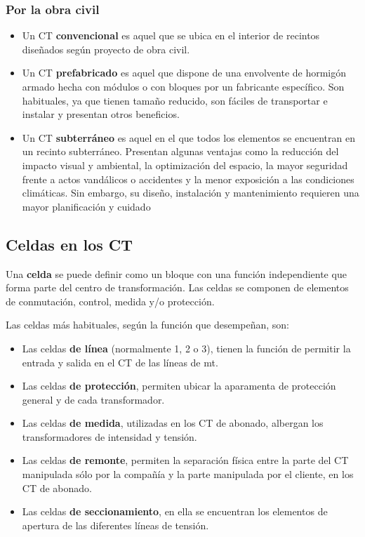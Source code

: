 \subsubsection{Por la obra civil}

\begin{itemize}
	\item Un CT \textbf{convencional} es aquel que se ubica en el interior de recintos diseñados según proyecto de obra civil.
	\item Un CT \textbf{prefabricado} es aquel que dispone de una envolvente de hormigón armado hecha con módulos o con bloques por un fabricante específico. Son habituales, ya que tienen tamaño reducido, son fáciles de transportar e instalar y presentan otros beneficios.
	\item Un CT \textbf{subterráneo} es aquel en el que todos los elementos se encuentran en un recinto subterráneo. Presentan algunas ventajas como la reducción del impacto visual y ambiental, la optimización del espacio, la mayor seguridad frente a actos vandálicos o accidentes y la menor exposición a las condiciones climáticas. Sin embargo, su diseño, instalación y mantenimiento requieren una mayor planificación y cuidado
\end{itemize}

\subsection{Celdas en los CT}

Una \textbf{celda} se puede definir como un bloque con una función independiente que forma parte del centro de transformación. Las celdas se componen de elementos de conmutación, control, medida y/o protección.

Las celdas más habituales, según la función que desempeñan, son:
\begin{itemize}
	\item Las celdas \textbf{de línea} (normalmente 1, 2 o 3), tienen la función de permitir la entrada y salida en el CT de las líneas de \acrshort{mt}.
	\item Las celdas \textbf{de protección}, permiten ubicar la aparamenta de protección general y de cada transformador.
	\item Las celdas \textbf{de medida}, utilizadas en los CT de abonado, albergan los transformadores de intensidad y tensión.
	\item Las celdas \textbf{de remonte}, permiten la separación física entre la parte del CT manipulada sólo por la compañía y la parte manipulada por el cliente, en los CT de abonado.
	\item Las celdas \textbf{de seccionamiento}, en ella se encuentran los elementos de apertura de las diferentes líneas de tensión.
\end{itemize}


